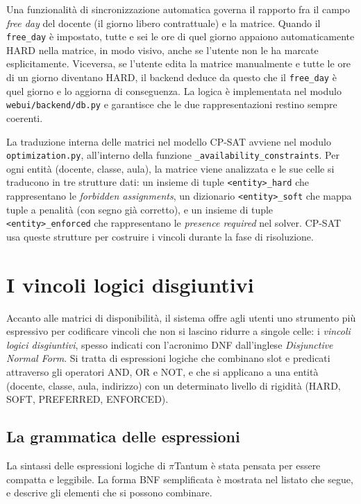 Una funzionalit\`a di sincronizzazione automatica governa il
rapporto fra il campo \emph{free day} del docente (il
giorno libero contrattuale) e la matrice. Quando il
\texttt{free\_day} \`e impostato, tutte e sei le ore di quel
giorno appaiono automaticamente HARD nella matrice, in modo
visivo, anche se l'utente non le ha marcate
esplicitamente. Viceversa, se l'utente edita la matrice
manualmente e tutte le ore di un giorno diventano HARD, il
backend deduce da questo che il \texttt{free\_day} \`e
quel giorno e lo aggiorna di conseguenza. La logica \`e
implementata nel modulo \texttt{webui/backend/db.py} e
garantisce che le due rappresentazioni restino sempre
coerenti.

La traduzione interna delle matrici nel modello CP-SAT
avviene nel modulo \texttt{optimization.py}, all'interno
della funzione \texttt{\_availability\_constraints}. Per
ogni entit\`a (docente, classe, aula), la matrice viene
analizzata e le sue celle si traducono in tre strutture
dati: un insieme di tuple \texttt{<entity>\_hard} che
rappresentano le \emph{forbidden assignments}, un dizionario
\texttt{<entity>\_soft} che mappa tuple a penalit\`a (con
segno gi\`a corretto), e un insieme di tuple
\texttt{<entity>\_enforced} che rappresentano le
\emph{presence required} nel solver. CP-SAT usa queste
strutture per costruire i vincoli durante la fase di
risoluzione.

\section{I vincoli logici disgiuntivi}

Accanto alle matrici di disponibilit\`a, il sistema offre
agli utenti uno strumento pi\`u espressivo per codificare
vincoli che non si lascino ridurre a singole celle: i
\emph{vincoli logici disgiuntivi}, spesso indicati con
l'acronimo DNF dall'inglese \emph{Disjunctive Normal Form}.
Si tratta di espressioni logiche che combinano slot e
predicati attraverso gli operatori AND, OR e NOT, e che si
applicano a una entit\`a (docente, classe, aula, indirizzo)
con un determinato livello di rigidit\`a (HARD, SOFT,
PREFERRED, ENFORCED).

\subsection{La grammatica delle espressioni}

La sintassi delle espressioni logiche di $\pi$Tantum \`e
stata pensata per essere compatta e leggibile. La forma BNF
semplificata \`e mostrata nel listato che segue, e descrive
gli elementi che si possono combinare.


